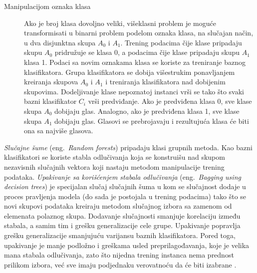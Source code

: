 \documentclass[12pt,oneside]{memoir}
\begin{document}
\begin{description}
\item[Manipulacijom oznaka klasa] Ako je broj klasa dovoljno veliki, višeklasni problem je moguće transformisati u binarni problem podelom oznaka klasa, na slučajan način, u dva disjunktna skupa $A_0$ i $A_1$. Trening podacima čije klase pripadaju skupu $A_0$ pridružuje se klasa 0, a podacima čije klase pripadaju skupu $A_1$ klasa 1. Podaci sa novim oznakama klasa se koriste za treniranje baznog klasifikatora. Grupa klasifikatora se dobija višestrukim ponavljanjem kreiranja skupova $A_0$ i $A_1$ i treniranja klasifikatora nad dobijenim skupovima. Dodeljivanje klase nepoznatoj instanci vrši se tako što svaki bazni klasifikator $C_i$ vrši predviđanje. Ako je predviđena klasa 0, sve klase skupa $A_0$ dobijaju glas. Analogno, ako je predviđena klasa 1, sve klase skupa $A_1$ dobijaju glas. Glasovi se prebrojavaju i rezultujuća klasa će biti ona sa najviše glasova. \par
\end{description}




\textit{Slučajne šume} (eng.~\textit{Random forests}) pripadaju klasi grupnih metoda. Kao bazni klasifikatori se koriste stabla odlučivanja koja se konstruišu nad skupom nezavisnih slučajnih vektora koji nastaju metodom manipulacije trening podataka. \textit{Upakivanje sa korišćenjem stabala odlučivanja} (eng.~\textit{Bagging using decision trees}) je specijalan slučaj slučajnih šuma u kom se slučajnost dodaje u proces pravljenja modela (do sada je postojala u trening podacima) tako što se novi skupovi podataka kreiraju metodom slučajnog izbora sa zamenom od elemenata polaznog skupa. Dodavanje slučajnosti smanjuje korelaciju između stabala, a samim tim i grešku generalizacije cele grupe. Upakivanje popravlja grešku generalizacije smanjujuću varijansu baznih klasifikatora. Pored toga, upakivanje je manje podložno i greškama usled preprilagođavanja, koje je velika mana stabala odlučivanja, zato što nijedna trening instanca nema prednost prilikom izbora, već sve imaju podjednaku verovatnoću da će biti izabrane \cite{mitic}.
\end{document}
